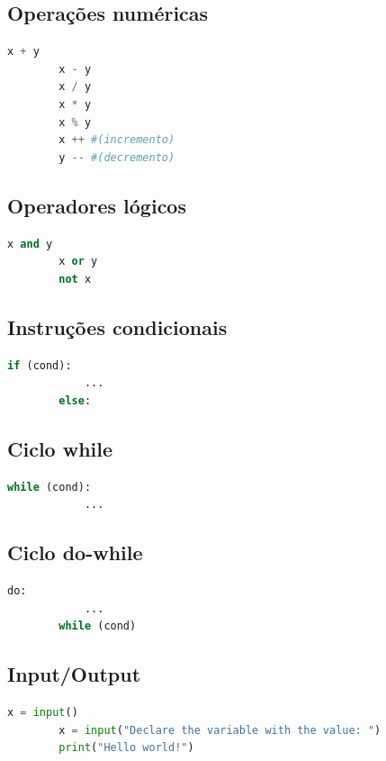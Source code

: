 \documentclass[11pt,a4paper]{report}
\begin{document}
    \subsection{Operações numéricas}
    \begin{lstlisting}[language=Python]
        x + y
        x - y
        x / y
        x * y
        x % y
        x ++ #(incremento)
        y -- #(decremento)
    \end{lstlisting}

    \subsection{Operadores lógicos}
    \begin{lstlisting}[language=Python]
        x and y
        x or y
        not x
    \end{lstlisting}

    \subsection{Instruções condicionais}
    \begin{lstlisting}[language=Python]
        if (cond):
            ...
        else:
    \end{lstlisting}

    \subsection{Ciclo while}
    \begin{lstlisting}[language=Python]
        while (cond):
            ...
    \end{lstlisting}

    \subsection{Ciclo do-while}
    \begin{lstlisting}[language=Python]
        do:
            ...
        while (cond)
    \end{lstlisting}

    \subsection{Input/Output}
    \begin{lstlisting}[language=Python]
        x = input()
        x = input("Declare the variable with the value: ")
        print("Hello world!")
    \end{lstlisting}
\end{document}
